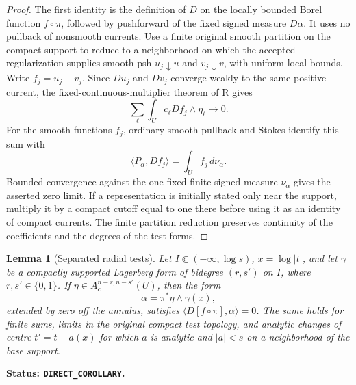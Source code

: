 \documentclass[11pt,a4paper]{article}
\numberwithin{equation}{section}
\newtheorem{lemma}[theorem]{Lemma}
\theoremstyle{definition}
\theoremstyle{remark}
\begin{document}
\begin{proof}
The first identity is the definition of $D$ on the locally bounded
Borel function $f\circ\pi$, followed by pushforward of the fixed
signed measure $D\alpha$. It uses no pullback of nonsmooth currents.
Use a finite original smooth partition on the compact support to
reduce to a neighborhood on which the accepted regularization supplies
smooth psh $u_j\downarrow u$ and $v_j\downarrow v$, with uniform
local bounds. Write $f_j=u_j-v_j$.
Since $Du_j$ and $Dv_j$ converge weakly to the same positive current,
the fixed-continuous-multiplier theorem of R gives
\[
 \sum_\ell\int_U c_\ell Df_j\wedge\eta_\ell\longrightarrow0.
\]
For the smooth functions $f_j$, ordinary smooth pullback and Stokes
identify this sum with
\[
 \langle P_\alpha,Df_j\rangle
      =\int_U f_j\,d\nu_\alpha.
\]
Bounded convergence against the one fixed finite signed measure
$\nu_\alpha$ gives the asserted zero limit. If a representation is
initially stated only near the support, multiply it by a compact
cutoff equal to one there before using it as an identity of compact
currents. The finite partition reduction preserves continuity of the
coefficients and the degrees of the test forms.
\end{proof}

\begin{lemma}[Separated radial tests]
\label{lem:r3-radial-separated-kernel}
Let $I\Subset(-\infty,\log s)$, $x=\log|t|$, and let
$\gamma$ be a compactly supported Lagerberg form of bidegree
$(r,s')$ on $I$, where $r,s'\in\{0,1\}$. If
$\eta\in A_c^{n-r,n-s'}(U)$, then the form
\[
 \alpha=\pi^*\eta\wedge\gamma(x),
\]
extended by zero off the annulus, satisfies
$\langle D[f\circ\pi],\alpha\rangle=0$.
The same holds for finite sums, limits in the original compact test
topology, and analytic changes of centre $t'=t-a(x)$ for which
$a$ is analytic and $|a|<s$ on a neighborhood of the base support.
\end{lemma}

\noindent\textbf{Status: \texttt{DIRECT\_COROLLARY}.}
\end{document}
